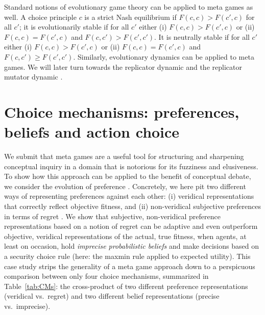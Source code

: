 \documentclass[fleqn,reqno,11pt]{article}
\begin{document}
Standard notions of evolutionary game theory can be applied to meta games as well. A choice
principle $c$ is a strict Nash equilibrium if $F(c,c) > F(c',c)$ for all $c'$; it is
evolutionarily stable if for all $c'$ either (i) $F(c,c) > F(c',c)$ or (ii) $F(c,c) = F(c',c)$
and $F(c,c') > F(c',c')$. It is neutrally stable if for all $c'$ either (i) $F(c,c) > F(c',c)$
or (ii) $F(c,c) = F(c',c)$ and $F(c,c') \ge F(c',c')$. Similarly, evolutionary dynamics can be
applied to meta games. We will later turn towards the replicator dynamic
\citep{TaylorJonker1978:Evolutionary-St} and the replicator mutator dynamic
\citep[e.g.][]{Nowak2006:Evolutionary-Dy}.




\section{Choice mechanisms: preferences, beliefs and action choice}
\label{sec:basic-notions}

We submit that meta games are a useful tool for structuring and sharpening conceptual inquiry
in a domain that is notorious for its fuzziness and elusiveness. To show how this approach can
be applied to the benefit of conceptual debate, we consider the evolution of preference
\citep[e.g.,][]{algweib13,DekElyYlan07,RobSam11}. Concretely, we here pit two different ways of
representing preferences against each other: (i) veridical representations that correctly
reflect objective fitness, and (ii) non-veridical subjective preferences in terms of regret
\citep[e.g.,][]{Savage1951:The-theory-of-s,}. We show that subjective, non-veridical preference
representations based on a notion of regret can be adaptive and even outperform objective,
veridical representations of the actual, true fitness, when agents, at least on occasion, hold
\emph{imprecise probabilistic beliefs} \citep[e.g.,][]{gilsch89,levi74,gardsah82} and make
decisions based on a security choice rule (here: the maxmin rule applied to expected
utility). This case study strips the generality of a meta game approach down to a perspicuous
comparison between only four choice mechanisms, summarized in Table~\ref{tab:CMs}: the
cross-product of two different preference representations (veridical vs.~regret) and two
different belief representations (precise vs.~imprecise). 
\end{document}
